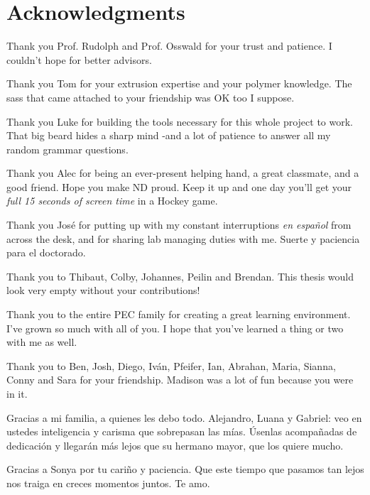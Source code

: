 \documentclass[main.tex]{subfiles}
\begin{document}
\chapter*{Acknowledgments}
{
\setlength{\parindent}{0cm}
\setlength{\parskip}{12pt}
Thank you Prof. Rudolph and Prof. Osswald for your trust and patience. I couldn't hope for better advisors.
     
Thank you Tom for your extrusion expertise and your polymer knowledge. The sass that came attached to your friendship was OK too I suppose.

Thank you Luke for building the tools necessary for this whole project to work. That big beard hides a sharp mind -and a lot of patience to answer all my random grammar questions.

Thank you Alec for being an ever-present helping hand, a great classmate, and a good friend. Hope you make ND proud. Keep it up and one day you'll get your \emph{full 15 seconds of screen time} in a Hockey game.

Thank you Jos\'e for putting up with my constant interruptions \emph{en espa\~nol} from across the desk, and for sharing lab managing duties with me. Suerte y paciencia para el doctorado. 

Thank you to Thibaut, Colby, Johannes, Peilin and Brendan. This thesis would look very empty without your contributions!
    
Thank you to the entire PEC family for creating a great learning environment. I've grown so much with all of you. I hope that you've learned a thing or two with me as well.

Thank you to Ben, Josh, Diego, Iv\'an, Pfeifer, Ian, Abrahan, Maria, Sianna, Conny and Sara for your friendship. Madison was a lot of fun because you were in it.

Gracias a mi familia, a quienes les debo todo. Alejandro, Luana y Gabriel: veo en ustedes inteligencia y carisma que sobrepasan las m\'ias. \'Usenlas acompa\~nadas de dedicaci\'on y llegar\'an m\'as lejos que su hermano mayor, que los quiere mucho. 

Gracias a Sonya por tu cari\~no y paciencia. Que este tiempo que pasamos tan lejos nos traiga en creces momentos juntos. Te amo.  
}
\end{document}
